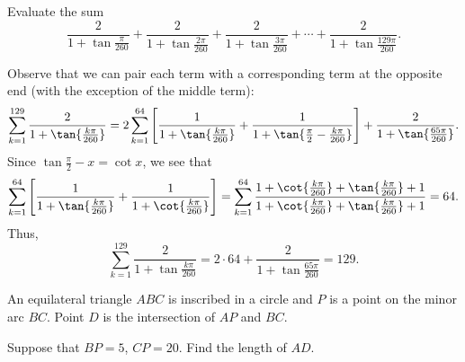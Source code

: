 \begin{question}[129]\label{A::2024-S-1-22}
    Evaluate the sum \[\frac{2}{1 + \tan{\frac{\pi}{260}}} + \frac{2}{1 + \tan{\frac{2\pi}{260}}} + \frac{2}{1 + \tan{\frac{3\pi}{260}}} + \cdots + \frac{2}{1 + \tan{\frac{129\pi}{260}}}.\]
\end{question}

Observe that we can pair each term with a corresponding term at the opposite end (with the exception of the middle term): \[\sum_{k = 1}^{129} \frac{2}{1 + \tan{\frac{k\pi}{260}}} = 2\sum_{k = 1}^{64} \bs{\frac{1}{1 + \tan{\frac{k\pi}{260}}} + \frac{1}{1 + \tan{\frac\pi2 - \frac{k\pi}{260}}}} + \frac{2}{1 + \tan{\frac{65\pi}{260}}}.\] Since $\tan{\frac\pi2 - x} = \cot x$, we see that \[\sum_{k = 1}^{64} \bs{\frac{1}{1 + \tan{\frac{k\pi}{260}}} + \frac{1}{1 + \cot{\frac{k\pi}{260}}}} = \sum_{k = 1}^{64} \frac{1 + \cot{\frac{k\pi}{260}} + \tan{\frac{k\pi}{260}} + 1}{1 + \cot{\frac{k\pi}{260}} + \tan{\frac{k\pi}{260}} + 1} = 64.\] Thus, \[\sum_{k = 1}^{129} \frac{2}{1 + \tan{\frac{k\pi}{260}}} = 2 \cdot 64 + \frac{2}{1 + \tan{\frac{65\pi}{260}}} = 129.\]

\clearpage
\begin{question}[21]\label{A::2024-S-1-23}
    An equilateral triangle $ABC$ is inscribed in a circle and $P$ is a point on the minor arc $BC$. Point $D$ is the intersection of $AP$ and $BC$.

    \begin{center}
    \end{center}

    \noindent Suppose that $BP = 5$, $CP = 20$. Find the length of $AD$.
\end{question}

